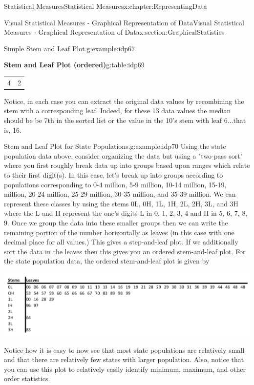 \documentclass[oneside,10pt,]{book}
\numberwithin{equation}{section}
\begin{document}
\begin{chapterptx}{Statistical Measures}{}{Statistical Measures}{}{}{x:chapter:RepresentingData}
\begin{sectionptx}{Visual Statistical Measures - Graphical Representation of Data}{}{Visual Statistical Measures - Graphical Representation of Data}{}{}{x:section:GraphicalStatistics}
\begin{example}{Simple Stem and Leaf Plot.}{g:example:idp67}
\begin{tableptx}{\textbf{Stem and Leaf Plot (ordered)}}{g:table:idp69}{}
{\begin{tabular}{rr}
4&\multicolumn{1}{l}{2}
\end{tabular}
}%
\end{tableptx}%
%
\par
Notice, in each case you can extract the original data values by recombining the stem with a corresponding leaf. Indeed, for these 13 data values the median should be be 7th in the sorted list or the value in the 10's stem with leaf 6...that is, 16.%
\end{example}
%
\par
\begin{example}{Stem and Leaf Plot for State Populations.}{g:example:idp70}%
Using the state population data above, consider organizing the data but using a "two-pass sort" where you first roughly break data up into groups based upon ranges which relate to their first digit(s). In this case, let's break up into groups according to populations corresponding to 0-4 million, 5-9 million, 10-14 million, 15-19, million, 20-24 million, 25-29 million, 30-35 million, and 35-39 million. We can represent these classes by using the stems 0L, 0H, 1L, 1H, 2L, 2H, 3L, and 3H where the L and H represent the one's digits L in \textbraceleft{}0, 1, 2, 3, 4\textbraceright{} and H in \textbraceleft{}5, 6, 7, 8, 9\textbraceright{}.  Once we group the data into these smaller groups then we can write the remaining portion of the number horizontally as leaves (in this case with one decimal place for all values.) This gives a step-and-leaf plot. If we additionally sort the data in the leaves then this gives you an ordered stem-and-leaf plot. For the state population data, the ordered stem-and-leaf plot is given by \begin{image}{0}{1}{0}%
\includegraphics[width=\linewidth]{images/stemandleaf.png}
\end{image}%
 Notice how it is easy to now see that most state populations are relatively small and that there are relatively few states with larger population. Also, notice that you can use this plot to relatively easily identify minimum, maximum, and other order statistics.%
\end{example}
%
\par

\end{sectionptx}
\end{chapterptx}
\end{document}
